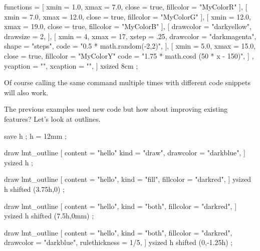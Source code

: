     functions = {
        [
            xmin      =  1.0,
            xmax      =  7.0,
            close     = true,
            fillcolor = "MyColorR"
        ],
        [
            xmin      =  7.0,
            xmax      = 12.0,
            close     = true,
            fillcolor = "MyColorG"
        ],
        [
            xmin      = 12.0,
            xmax      = 19.0,
            close     = true,
            fillcolor = "MyColorB"
        ],
        [
            drawcolor = "darkyellow",
            drawsize  = 2,
        ],
        [
            xmin      =   4,
            xmax      =  17,
            xstep     = .25,
            drawcolor = "darkmagenta",
            shape     = "steps",
            code      = "0.5 * math.random(-2,2)",
        ],
        [
            xmin      =  5.0,
            xmax      = 15.0,
            close     = true,
            fillcolor = "MyColorY"
            code      = "1.75 * math.cosd (50 * x - 150)",
        ]
    },
    ycaption  = "",
    xcaption  = "",
]
    xsized 8cm
;
\stopMPcode
\stopbuffer

\typebuffer[option=TEX]

Of course calling the same command multiple times with different code snippets
will also work.

\startlinecorrection
\getbuffer
\stoplinecorrection

The previous examples used new code but how about improving existing features?
Let's look at outlines.

\startbuffer
{}
    save h ; h = 12mm ;

    draw lmt_outline [
        content   = "hello"
        kind      = "draw",
        drawcolor = "darkblue",
    ] ysized h ;

    draw lmt_outline [
        content       = "hello",
        kind          = "fill",
        fillcolor     = "darkred",
    ] ysized h shifted (3.75h,0) ;

    draw lmt_outline [
        content       = "hello",
        kind          = "both",
        fillcolor     = "darkred",
    ] ysized h shifted (7.5h,0mm) ;

    draw lmt_outline [
        content       = "hello",
        kind          = "both",
        fillcolor     = "darkred",
        drawcolor     = "darkblue",
        rulethickness = 1/5,
    ] ysized h shifted (0,-1.25h) ;

